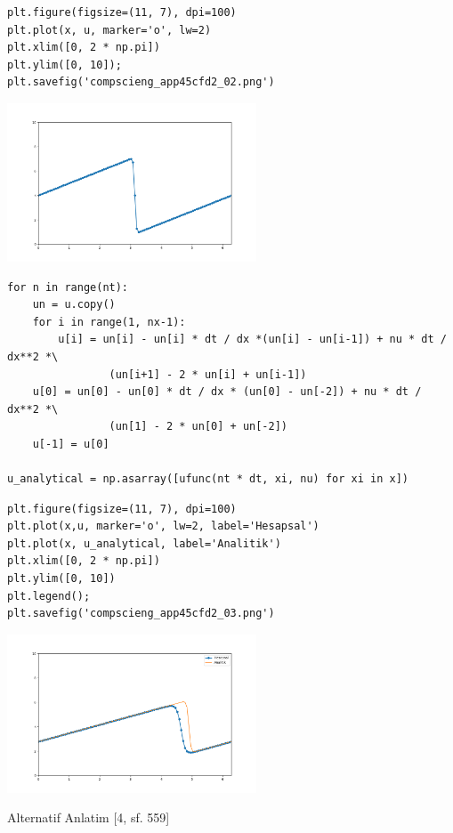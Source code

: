 \documentclass[12pt,fleqn]{article}\usepackage{../../common}
\begin{document}
\begin{verbatim}
plt.figure(figsize=(11, 7), dpi=100)
plt.plot(x, u, marker='o', lw=2)
plt.xlim([0, 2 * np.pi])
plt.ylim([0, 10]);
plt.savefig('compscieng_app45cfd2_02.png')
\end{verbatim}


\includegraphics[width=20em]{compscieng_app45cfd2_02.png}

\begin{verbatim}
for n in range(nt):
    un = u.copy()
    for i in range(1, nx-1):
        u[i] = un[i] - un[i] * dt / dx *(un[i] - un[i-1]) + nu * dt / dx**2 *\
                (un[i+1] - 2 * un[i] + un[i-1])
    u[0] = un[0] - un[0] * dt / dx * (un[0] - un[-2]) + nu * dt / dx**2 *\
                (un[1] - 2 * un[0] + un[-2])
    u[-1] = u[0]
        
u_analytical = np.asarray([ufunc(nt * dt, xi, nu) for xi in x])
\end{verbatim}

\begin{verbatim}
plt.figure(figsize=(11, 7), dpi=100)
plt.plot(x,u, marker='o', lw=2, label='Hesapsal')
plt.plot(x, u_analytical, label='Analitik')
plt.xlim([0, 2 * np.pi])
plt.ylim([0, 10])
plt.legend();
plt.savefig('compscieng_app45cfd2_03.png')
\end{verbatim}


\includegraphics[width=20em]{compscieng_app45cfd2_03.png}

Alternatif Anlatim [4, sf. 559]
\end{document}
